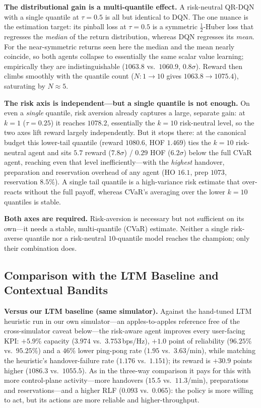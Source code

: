 \documentclass[conference]{IEEEtran}
\begin{document}
\textbf{The distributional gain is a multi-quantile effect.} A risk-neutral
QR-DQN with a single quantile at $\tau=0.5$ is all but identical to DQN. The one
nuance is the estimation target: its pinball loss at $\tau=0.5$ is a symmetric
$\tfrac12$-Huber loss that regresses the \emph{median} of the return
distribution, whereas DQN regresses its \emph{mean}. For the near-symmetric
returns seen here the median and the mean nearly coincide, so both agents
collapse to essentially the same scalar value learning; empirically they are
indistinguishable ($1063.8$ vs.\ $1060.9$, $0.8\sigma$). Reward then climbs
smoothly with the quantile count ($N{:}1\!\to\!10$ gives
$1063.8\!\to\!1075.4$), saturating by $N\approx5$.

\textbf{The risk axis is independent---but a single quantile is not enough.} On
even a \emph{single} quantile, risk aversion already captures a large, separate
gain: at $k{=}1$ ($\tau=0.25$) it reaches $1078.2$, essentially the $k{=}10$
risk-neutral level, so the two axes lift reward largely independently. But it
stops there: at the canonical budget this lower-tail quantile (reward $1080.6$,
HOF $1.469$) ties the $k{=}10$ risk-neutral agent and sits $5.7$ reward
($7.8\sigma$) / $0.29$ HOF ($6.2\sigma$) below the full CVaR agent, reaching
even that level inefficiently---with the \emph{highest} handover, preparation
and reservation overhead of any agent (HO $16.1$, prep $1073$, reservation
$8.5\%$). A single tail quantile is a high-variance risk estimate that
over-reacts without the full payoff, whereas CVaR's averaging over the lower
$k{=}10$ quantiles is stable.

\textbf{Both axes are required.} Risk-aversion is necessary but not sufficient
on its own---it needs a stable, multi-quantile (CVaR) estimate. Neither a
single risk-averse quantile nor a risk-neutral $10$-quantile model reaches the
champion; only their combination does.

\subsection{Comparison with the LTM Baseline and Contextual Bandits}
\label{sec:results-baselines}
\textbf{Versus our LTM baseline (same simulator).} Against the hand-tuned LTM
heuristic run in our own simulator---an apples-to-apples reference free of the
cross-simulator caveat below---the risk-aware agent improves every user-facing
KPI: $+5.9\%$ capacity ($3.974$ vs.\ $3.753$\,bps/Hz), $+1.0$ point of
reliability ($96.25\%$ vs.\ $95.25\%$) and a $46\%$ lower ping-pong rate
($1.95$ vs.\ $3.63$/min), while matching the heuristic's handover-failure rate
($1.176$ vs.\ $1.151$); its reward is $+30.9$ points higher ($1086.3$ vs.\
$1055.5$). As in the three-way comparison it pays for this with more
control-plane activity---more handovers ($15.5$ vs.\ $11.3$/min), preparations
and reservations---and a higher RLF ($0.093$ vs.\ $0.065$): the policy is more
willing to act, but its actions are more reliable and higher-throughput.
\end{document}
